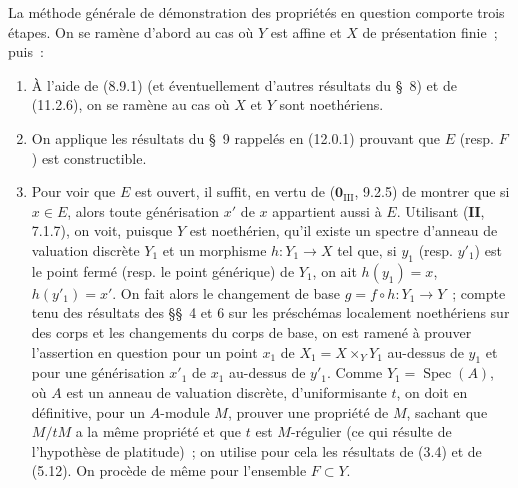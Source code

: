 \begin{env}[12.0.2]
\label{IV.12.0.2-fr}
La méthode générale de démonstration des propriétés en question comporte trois
étapes. On se ramène d'abord au cas où $Y$ est affine et $X$ de présentation
finie~; puis~:
\begin{enumerate}[label=\emph{\Alph*)}]
  \item À l'aide de (8.9.1) (et éventuellement d'autres résultats du \S~8) et
  de (11.2.6), on se ramène au cas où $X$ et $Y$ sont noethériens.
  \item On applique les résultats du \S~9 rappelés en (12.0.1) prouvant que
  $E$ (resp. $F$) est constructible.
  \item Pour voir que $E$ est ouvert, il suffit, en vertu de
  ($\mathbf 0_{\mathrm{III}}$, 9.2.5) de montrer que si $x\in E$, alors toute
  générisation $x'$ de $x$ appartient aussi à $E$. Utilisant ($\mathbf{II}$,
  7.1.7), on voit, puisque $Y$ est noethérien, qu'il existe un spectre d'anneau
  de valuation discrète $Y_1$ et un morphisme $h:Y_1\to X$ tel que, si $y_1$
  (resp. $y'_1$) est le point fermé (resp. le point générique) de $Y_1$, on ait
  $h(y_1)=x$, $h(y'_1)=x'$. On fait alors le changement de base
  $g=f\circ h:Y_1\to Y$~; compte tenu des résultats des \S\S~4 et 6 sur les
  préschémas localement noethériens sur des corps et les changements du corps
  de base, on est ramené à prouver l'assertion en question pour un point $x_1$
  de $X_1=X\times_YY_1$ au-dessus de $y_1$ et pour une générisation $x'_1$ de
  $x_1$ au-dessus de $y'_1$. Comme $Y_1=\operatorname{Spec}(A)$, où $A$ est
  un anneau de valuation discrète, d'uniformisante $t$, on doit en définitive,
  pour un $A$-module $M$, prouver une propriété de $M$, sachant que $M/tM$ a
  la même propriété et que $t$ est $M$-régulier (ce qui résulte de l'hypothèse
  de platitude)~; on utilise pour cela les résultats de (3.4) et de (5.12). On
  procède de même pour l'ensemble $F\subset Y$.
\end{enumerate}
\end{env}

